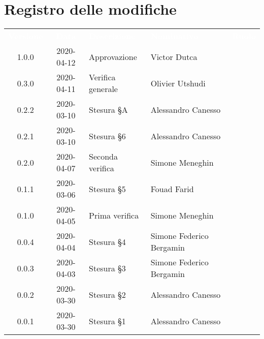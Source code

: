 \section*{Registro delle modifiche}
{
	\centering
	\begin{longtable}{ c c  C{4cm}  C{4cm}  C{3cm} }
		\textcolor{white}{\textbf{Versione}} & \textcolor{white}{\textbf{Data}} & \textcolor{white}{\textbf{Descrizione}} & \textcolor{white}{\textbf{Nominativo}} & \textcolor{white}{\textbf{Ruolo}}\\		
		1.0.0 & 2020-04-12   & Approvazione & Victor Dutca &\RdP{} \\
		0.3.0 & 2020-04-11   & Verifica generale & Olivier Utshudi &\ver{} \\
		0.2.2 & 2020-03-10 & Stesura \S A & Alessandro Canesso &\Res{} \\
		0.2.1 & 2020-03-10 & Stesura \S 6 & Alessandro Canesso &\Res{} \\
		0.2.0 & 2020-04-07   & Seconda verifica & Simone Meneghin &\ver{} \\
		0.1.1 & 2020-03-06 & Stesura \S 5  & Fouad Farid &\Res{} \\
		0.1.0 & 2020-04-05   & Prima verifica & Simone Meneghin &\ver{} \\
		0.0.4 & 2020-04-04 & Stesura \S 4  & Simone Federico Bergamin &\adm{}\\	
		0.0.3 & 2020-04-03 & Stesura \S 3  & Simone Federico Bergamin &\adm{}\\	
		0.0.2 & 2020-03-30 & Stesura \S 2  & Alessandro Canesso &\Res{}\\	
		0.0.1 & 2020-03-30 & Stesura \S 1  & Alessandro Canesso &\Res{}\\		
	\end{longtable}
} 
